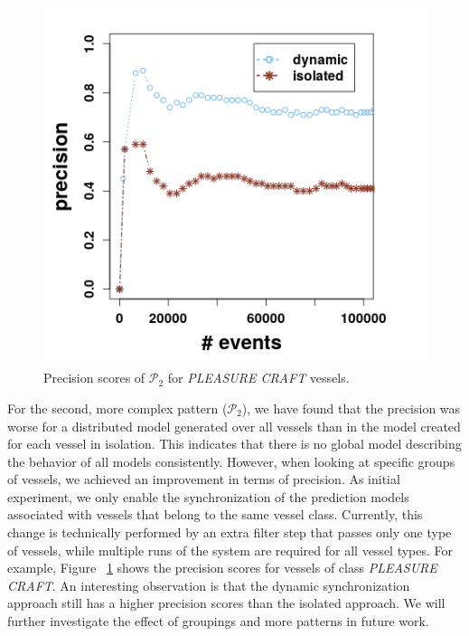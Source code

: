  \begin{figure}[h]
	
	\includegraphics[width=.5\textwidth]{figures/precision_p2.png}
	
	\caption{Precision scores of $\mathcal{P}_2$  for \textit{PLEASURE CRAFT} vessels.}
	\label{fig:precsions_p2}
\end{figure}

For the second, more complex pattern ($\mathcal{P}_2$), we have found that the precision was worse for a distributed model generated over all vessels than in the model created for each vessel in isolation. This indicates that there is no  global model describing the behavior of all models consistently. However, when looking at specific groups of vessels, we achieved an improvement in terms of precision. As initial experiment, we only enable the synchronization of the prediction models associated with vessels that belong to the same vessel class. Currently, this change is technically performed by an extra filter step that passes only one type of vessels, while multiple runs of the system are required for all vessel types. For example, Figure ~\ref{fig:precsions_p2} shows the precision scores for vessels of class \textit{PLEASURE CRAFT}. An interesting observation is that the dynamic synchronization approach still has  a higher precision scores than the isolated approach. We will further investigate the effect of groupings and more patterns in future work.































